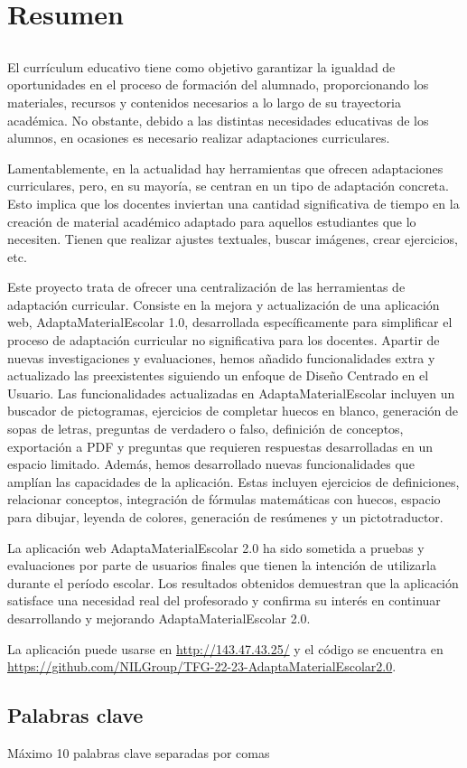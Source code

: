 \chapter*{Resumen}

\section*{\tituloPortadaVal}

El currículum educativo tiene como objetivo garantizar la igualdad de oportunidades en el proceso de formación del alumnado, proporcionando los materiales, recursos y contenidos necesarios a lo largo de su trayectoria académica. No obstante, debido a las distintas necesidades educativas de los alumnos, en ocasiones es necesario realizar adaptaciones curriculares.

Lamentablemente, en la actualidad hay herramientas que ofrecen adaptaciones curriculares, pero, en su mayoría, se centran en un tipo de adaptación concreta. Esto implica que los docentes inviertan una cantidad significativa de tiempo en la creación de material académico adaptado para aquellos estudiantes que lo necesiten. Tienen que realizar ajustes textuales, buscar imágenes, crear ejercicios, etc.

Este proyecto trata de ofrecer una centralización de las herramientas de adaptación curricular. Consiste en la mejora y actualización de una aplicación web, AdaptaMaterialEscolar 1.0, desarrollada específicamente para simplificar el proceso de adaptación curricular no significativa para los docentes. Apartir de nuevas investigaciones y evaluaciones, hemos añadido funcionalidades extra y actualizado las preexistentes siguiendo un enfoque de Diseño Centrado en el Usuario. Las funcionalidades actualizadas en AdaptaMaterialEscolar incluyen un buscador de pictogramas, ejercicios de completar huecos en blanco, generación de sopas de letras, preguntas de verdadero o falso, definición de conceptos, exportación a PDF y preguntas que requieren respuestas desarrolladas en un espacio limitado. Además, hemos desarrollado nuevas funcionalidades que amplían las capacidades de la aplicación. Estas incluyen ejercicios de definiciones, relacionar conceptos, integración de fórmulas matemáticas con huecos, espacio para dibujar, leyenda de colores, generación de resúmenes y un pictotraductor.

La aplicación web AdaptaMaterialEscolar 2.0 ha sido sometida a pruebas y evaluaciones por parte de usuarios finales que tienen la intención de utilizarla durante el período escolar. Los resultados obtenidos demuestran que la aplicación satisface una necesidad real del profesorado y confirma su interés en continuar desarrollando y mejorando AdaptaMaterialEscolar 2.0.

La aplicación puede usarse en \url{http://143.47.43.25/} y el código se encuentra en \url{https://github.com/NILGroup/TFG-22-23-AdaptaMaterialEscolar2.0}.

\section*{Palabras clave}
   
\noindent Máximo 10 palabras clave separadas por comas

   


